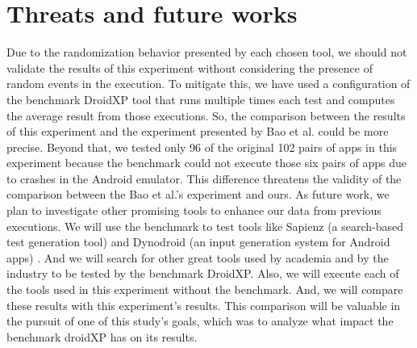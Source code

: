 \section{Threats and future works}

Due to the randomization behavior presented by each chosen tool, we should not validate the results of this experiment without considering the presence of random events in the execution. To mitigate this, we have used a configuration of the benchmark DroidXP tool that runs multiple times each test and computes the average result from those executions. So, the comparison between the results of this experiment and the experiment presented by Bao et al. could be more precise.
Beyond that, we tested only 96 of the original 102 pairs of apps in this experiment because the benchmark could not execute those six pairs of apps due to crashes in the Android emulator. This difference threatens the validity of the comparison between the Bao et al.'s experiment and ours.
As future work, we plan to investigate other promising tools to enhance our data from previous executions. We will use the benchmark to test tools like Sapienz (a search-based test generation tool) \cite{DBLP:conf/issta/MaoHJ16} and Dynodroid (an input generation system for Android apps) \cite{DBLP:conf/sigsoft/MachiryTN13}. And we will search for other great tools used by academia and by the industry to be tested by the benchmark DroidXP.
Also, we will execute each of the tools used in this experiment without the benchmark. And, we will compare these results with this experiment's results. This comparison will be valuable in the pursuit of one of this study's goals, which was to analyze what impact the benchmark droidXP has on its results. 

